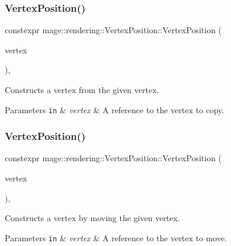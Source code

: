 \subsubsection{\texorpdfstring{Vertex\+Position()}{VertexPosition()}\hspace{0.1cm}{\footnotesize\ttfamily [3/4]}}
{\footnotesize\ttfamily constexpr mage\+::rendering\+::\+Vertex\+Position\+::\+Vertex\+Position (\begin{DoxyParamCaption}\item[{const \hyperlink{structmage_1_1rendering_1_1_vertex_position}{Vertex\+Position} \&}]{vertex }\end{DoxyParamCaption})\hspace{0.3cm}{\ttfamily [default]}, {\ttfamily [noexcept]}}

Constructs a vertex from the given vertex.


\begin{DoxyParams}[1]{Parameters}
\mbox{\tt in}  & {\em vertex} & A reference to the vertex to copy. \\
\hline
\end{DoxyParams}
\hypertarget{structmage_1_1rendering_1_1_vertex_position_ad886c8131e6cf96dac4a716907b532ad}{}\label{structmage_1_1rendering_1_1_vertex_position_ad886c8131e6cf96dac4a716907b532ad} 
\subsubsection{\texorpdfstring{Vertex\+Position()}{VertexPosition()}\hspace{0.1cm}{\footnotesize\ttfamily [4/4]}}
{\footnotesize\ttfamily constexpr mage\+::rendering\+::\+Vertex\+Position\+::\+Vertex\+Position (\begin{DoxyParamCaption}\item[{\hyperlink{structmage_1_1rendering_1_1_vertex_position}{Vertex\+Position} \&\&}]{vertex }\end{DoxyParamCaption})\hspace{0.3cm}{\ttfamily [default]}, {\ttfamily [noexcept]}}

Constructs a vertex by moving the given vertex.


\begin{DoxyParams}[1]{Parameters}
\mbox{\tt in}  & {\em vertex} & A reference to the vertex to move. \\
\hline
\end{DoxyParams}
\hypertarget{structmage_1_1rendering_1_1_vertex_position_afe5c10d9422cd3b37acecd3691361057}{}\label{structmage_1_1rendering_1_1_vertex_position_afe5c10d9422cd3b37acecd3691361057} 
